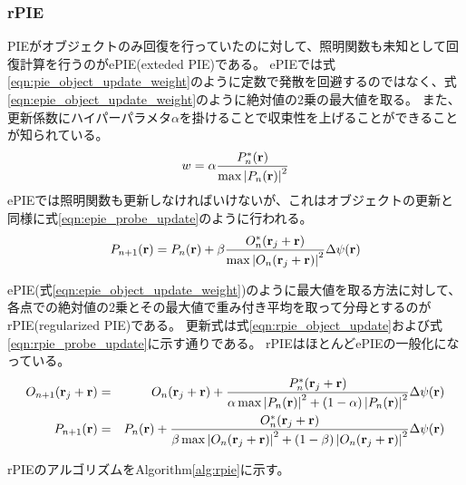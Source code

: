 \subsubsection{rPIE}
PIEがオブジェクトのみ回復を行っていたのに対して、照明関数も未知として回復計算を行うのがePIE(exteded PIE)である。
ePIEでは式\ref{eqn:pie_object_update_weight}のように定数で発散を回避するのではなく、式\ref{eqn:epie_object_update_weight}のように絶対値の2乗の最大値を取る。
また、更新係数にハイパーパラメタ$\alpha$を掛けることで収束性を上げることができることが知られている。
\begin{equation}
  \label{eqn:epie_object_update_weight}
  w = \alpha \frac{P_n^*(\mathbf{r})}{\max \left| P_n(\mathbf{r}) \right|^2}
\end{equation}
ePIEでは照明関数も更新しなければいけないが、これはオブジェクトの更新と同様に式\ref{eqn:epie_probe_update}のように行われる。
\begin{equation}
\label{eqn:epie_probe_update}
  P_{n+1}(\mathbf{r}) 
  = P_n(\mathbf{r}) 
  + \beta \frac{O_n^*(\mathbf{r}_j + \mathbf{r})}{\max \left| O_n(\mathbf{r}_j + \mathbf{r}) \right|^2} \Delta\psi(\mathbf{r})
\end{equation}

ePIE(式\ref{eqn:epie_object_update_weight})のように最大値を取る方法に対して、各点での絶対値の2乗とその最大値で重み付き平均を取って分母とするのがrPIE(regularized PIE)である。
更新式は式\ref{eqn:rpie_object_update}および式\ref{eqn:rpie_probe_update}に示す通りである。
rPIEはほとんどePIEの一般化になっている。
\begin{eqnarray}
  O_{n+1}(\mathbf{r}_j + \mathbf{r}) &=& O_n(\mathbf{r}_j + \mathbf{r}) 
    + \frac{P_n^*(\mathbf{r}_j + \mathbf{r})}
      {\alpha \max \left| P_n(\mathbf{r}) \right|^2 + (1-\alpha) \left| P_n(\mathbf{r}) \right|^2}
    \Delta\psi(\mathbf{r}) \label{eqn:rpie_object_update} \\
  P_{n+1}(\mathbf{r}) &=& P_n(\mathbf{r}) 
    + \frac{O_n^*(\mathbf{r}_j + \mathbf{r})}
      {\beta \max \left| O_n(\mathbf{r}_j + \mathbf{r}) \right|^2 + (1-\beta) \left| O_n(\mathbf{r}_j + \mathbf{r}) \right|^2}
    \Delta\psi(\mathbf{r}) \label{eqn:rpie_probe_update}
\end{eqnarray}

rPIEのアルゴリズムをAlgorithm\ref{alg:rpie}に示す。

